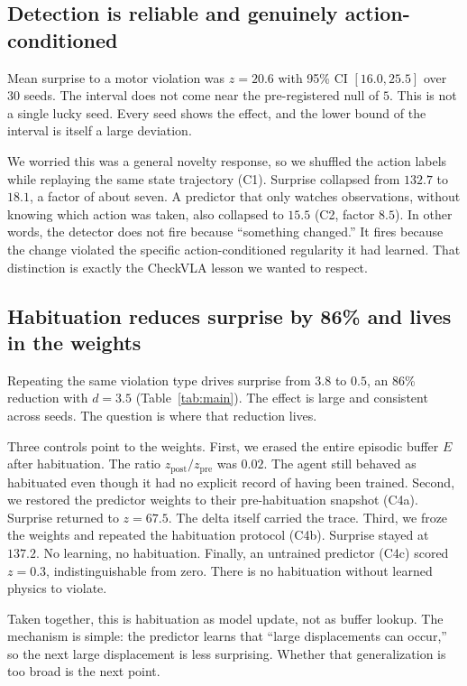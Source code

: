 \documentclass[11pt,a4paper]{article}
\begin{document}
\subsection{Detection is reliable and genuinely action-conditioned}

Mean surprise to a motor violation was $z=20.6$ with 95\% CI $[16.0, 25.5]$ over 30 seeds. The interval does not come near the pre-registered null of $5$. This is not a single lucky seed. Every seed shows the effect, and the lower bound of the interval is itself a large deviation.

We worried this was a general novelty response, so we shuffled the action labels while replaying the same state trajectory (C1). Surprise collapsed from $132.7$ to $18.1$, a factor of about seven. A predictor that only watches observations, without knowing which action was taken, also collapsed to $15.5$ (C2, factor $8.5$). In other words, the detector does not fire because ``something changed.'' It fires because the change violated the specific action-conditioned regularity it had learned. That distinction is exactly the CheckVLA lesson we wanted to respect.

\subsection{Habituation reduces surprise by 86\% and lives in the weights}

Repeating the same violation type drives surprise from $3.8$ to $0.5$, an 86\% reduction with $d=3.5$ (Table~\ref{tab:main}). The effect is large and consistent across seeds. The question is where that reduction lives.

Three controls point to the weights. First, we erased the entire episodic buffer $E$ after habituation. The ratio $z_{\mathrm{post}}/z_{\mathrm{pre}}$ was $0.02$. The agent still behaved as habituated even though it had no explicit record of having been trained. Second, we restored the predictor weights to their pre-habituation snapshot (C4a). Surprise returned to $z=67.5$. The delta itself carried the trace. Third, we froze the weights and repeated the habituation protocol (C4b). Surprise stayed at $137.2$. No learning, no habituation. Finally, an untrained predictor (C4c) scored $z=0.3$, indistinguishable from zero. There is no habituation without learned physics to violate.

Taken together, this is habituation as model update, not as buffer lookup. The mechanism is simple: the predictor learns that ``large displacements can occur,'' so the next large displacement is less surprising. Whether that generalization is too broad is the next point.
\end{document}
